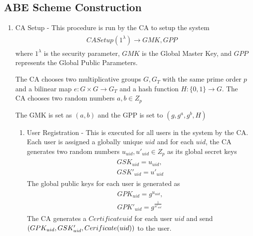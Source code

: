 \subsection{ABE Scheme Construction}

\begin{enumerate}
	
	\item CA Setup - This procedure is run by the CA to setup the system
	\begin{align}
	\begin{split}
	CASetup(1^{\lambda}) \longrightarrow GMK, GPP
	\end{split}
	\end{align}
	where $ 1^{\lambda} $ is the security parameter, $ GMK $ is the Global Master Key, and $ GPP $ represents the Global Public Parameters.
	
	The CA chooses two multiplicative groups $ G, G_{T} $ with the same prime order $ p $ and a bilinear map $ e \colon G \times G \rightarrow G_{T} $ and a hash function $ H \colon \{0, 1\} \rightarrow G. $ The CA chooses two random numbers $ a, b \in Z_{p} $
	
	The GMK is set as $ (a, b) $ and the GPP is set to $ (g, g^{a}, g^{b}, H) $
	
	\begin{enumerate}
		
		\item User Registration - This is executed for all users in the system by the CA. Each user is assigned a globally unique $ uid $ and for each $ uid $, the CA generates two random numbers $ u_{uid}, u'_{uid} \in Z_{p} $ as its global secret keys
		\begin{align}
		\begin{split}
		&GSK_{uid} = u_{uid}, \\ &GSK'_{uid} = u'_{uid}
		\end{split}
		\end{align}
		The global public keys for each user is generated as 
		\begin{align}
		\begin{split}
		&GPK_{uid} = g^{u_{uid}}, \\ &GPK'_{uid} = g^{\frac{1}{u'_{uid}}}
		\end{split}
		\end{align}
		The CA generates a $ Certificate{uid} $ for each user $ uid $ and send $ (GPK_{uid}, GSK'_{uid}, \\ Cerificate(uid)) $ to the user.
		

\end{enumerate}
\end{enumerate}
